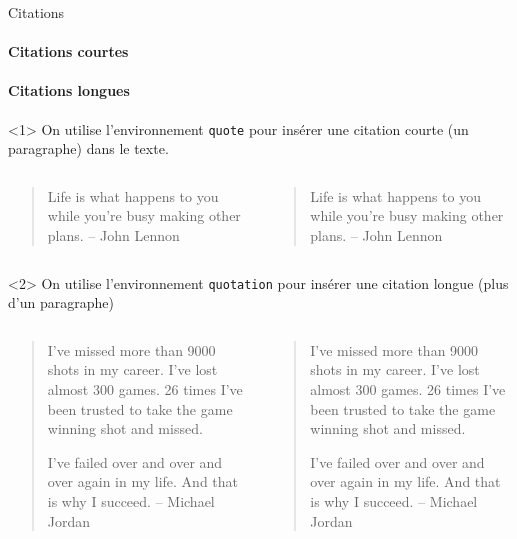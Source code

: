 \begin{frame}[fragile,c]{Citations}
	\framesubtitle<1>{Citations courtes}
	\framesubtitle<2>{Citations longues}
	\begin{onlyenv}
		On utilise l'environnement \texttt{quote} pour insérer une citation courte (un paragraphe)
		dans le texte.
	
		\begin{columns}
			\begin{column}{.49\textwidth}
				\vspace{-17mm}
\begin{codesource}
	\begin{quote}
		Life is what happens to you while 
		you're busy making other plans. 
		-- John Lennon
	\end{quote}
\end{codesource}
			\end{column}
		
			\begin{column}{.49\textwidth}
				\begin{quote}
					Life is what happens to you while you're busy making other plans. -- John Lennon
				\end{quote}
			\end{column}
		\end{columns}
	\end{onlyenv}

	\begin{onlyenv}
		On utilise l'environnement \texttt{quotation} pour insérer une citation longue (plus
		d'un paragraphe)
		
		\begin{columns}
			\begin{column}{.49\textwidth}
				\vspace{-38mm}
\begin{codesource}
	\begin{quotation}
		I've missed more than 9000 shots in my 
		career. I've lost almost 300 games. 26 
		times I've been trusted to take the game 
		winning shot and missed.
		
		I've failed over and over and over again 
		in my life. And that is why I succeed. 
		-- Michael Jordan
	\end{quotation}
\end{codesource}	
			\end{column}
		
			\begin{column}{.49\textwidth}
\begin{quotation}
	I've missed more than 9000 shots in my career. 
	I've lost almost 300 games. 26 times I've been 
	trusted to take the game winning shot and missed.
	
	I've failed over and over and over again in my life. 
	And that is why I succeed. -- Michael Jordan
\end{quotation}
			\end{column}
		\end{columns}
	\end{onlyenv}
\end{frame}

